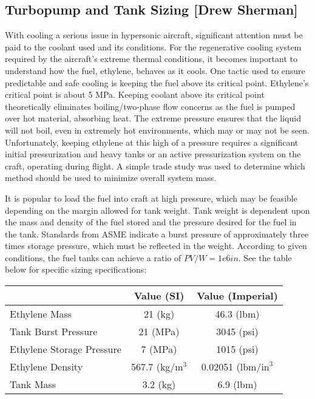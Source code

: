\subsection{Turbopump and Tank Sizing [Drew Sherman]}
With cooling a serious issue in hypersonic aircraft, significant attention must be paid to the coolant used and its conditions. For the regenerative cooling system required by the aircraft’s extreme thermal conditions, it becomes important to understand how the fuel, ethylene, behaves as it cools. One tactic used to ensure predictable and safe cooling is keeping the fuel above its critical point. Ethylene’s critical point is about 5 MPa. Keeping coolant above its critical point theoretically eliminates boiling/two-phase flow concerns as the fuel is pumped over hot material, absorbing heat. The extreme pressure ensures that the liquid will not boil, even in extremely hot environments, which may or may not be seen. Unfortunately, keeping ethylene at this high of a pressure requires a significant initial pressurization and heavy tanks or an active pressurization system on the craft, operating during flight. A simple trade study was used to determine which method should be used to minimize overall system mass. 

It is popular to load the fuel into craft at high pressure, which may be feasible depending on the margin allowed for tank weight. Tank weight is dependent upon the mass and density of the fuel stored and the pressure desired for the fuel in the tank. Standards from ASME indicate a burst pressure of approximately three times storage pressure, which must be reflected in the weight. According to given conditions, the fuel tanks can achieve a ratio of $PV/W = 1e6 in$. See the table below for specific sizing specifications: 

\begin{center}
\begin{tabular}{l | c | c}
& Value (SI) & Value (Imperial) \\
\hline
Ethylene Mass & 21 (kg) & 46.3 (lbm) \\
Tank Burst Pressure & 21 (MPa) & 3045 (psi) \\
Ethylene Storage Pressure & 7 (MPa) & 1015 (psi) \\
Ethylene Density & 567.7 (kg/$\text{m}^3$ & 0.02051 (lbm/$\text{in}^3$ \\
Tank Mass & 3.2 (kg) & 6.9 (lbm)
\end{tabular}
\end{center}

